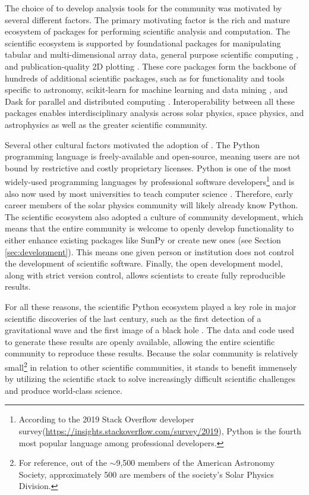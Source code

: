 The choice of \python to develop analysis tools for the community was motivated by several different factors.
The primary motivating factor is the rich and mature ecosystem of packages for performing scientific analysis and computation. 
The scientific \python ecosystem is supported by foundational packages for manipulating tabular \citep[\pandas,][]{pandas} and multi-dimensional array\citep[\numpy,][]{numpy} data, general purpose scientific computing \citep[\scipy,][]{scipy}, and publication-quality 2D plotting \citep[\matplotlib,][]{matplotlib}. 
These core packages form the backbone of hundreds of additional scientific \python packages, such as \astropypkg for functionality and tools specific to astronomy, scikit-learn for machine learning and data mining \citep{pedregosa11}, and Dask for parallel and distributed computing \citep{rocklin15}. Interoperability between all these packages enables interdisciplinary analysis across solar physics, space physics, and astrophysics as well as the greater scientific community.

Several other cultural factors motivated the adoption of \python.
The Python programming language is freely-available and open-source, meaning users are not bound by restrictive and costly proprietary licenses.
Python is one of the most widely-used programming languages by professional software developers\footnote{According to the 2019 Stack Overflow developer survey(\url{https://insights.stackoverflow.com/survey/2019}), Python is the fourth most popular language among professional developers.} and is also now used by most universities to teach computer science \citep{guo2014}.
Therefore, early career members of the solar physics community will likely already know Python.
The scientific \python ecosystem also adopted a culture of community development, which means that the entire community is welcome to openly develop functionality to either enhance existing packages like SunPy or create new ones (see Section \ref{sec:development}).
This means one given person or institution does not control the development of scientific software.
Finally, the open development model, along with strict version control, allows scientists to create fully reproducible results.

For all these reasons, the scientific Python ecosystem played a key role in major scientific discoveries of the last century, such as the first detection of a gravitational wave \citep{ligo_scientific_collaboration_and_virgo_collaboration_observation_2016} and the first image of a black hole \citep{collaboration_first_2019}.
The data and code used to generate these results are openly available, allowing the entire scientific community to reproduce these results.
Because the solar community is relatively small\footnote{For reference, out of the $\sim$9,500 members of the American Astronomy Society, approximately 500 are members of the society's Solar Physics Division.} in relation to other scientific communities, it stands to benefit immensely by utilizing the \python scientific stack to solve increasingly difficult scientific challenges and produce world-class science.

